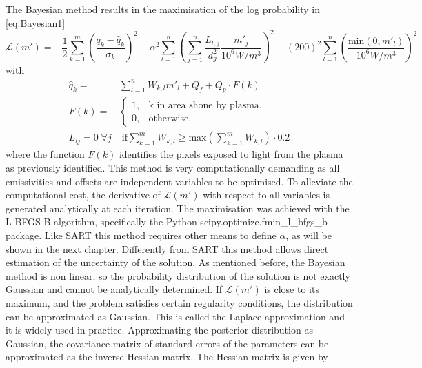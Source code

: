 The Bayesian  method results in the maximisation of the log probability in \autoref{eq:Bayesian1}
\begin{equation}
\mathcal{L}(m') = -\frac{1}{2} \sum_{k=1}^{m} \left(\frac{q_k - \hat{q}_k}{\sigma_k}\right)^2 - \alpha^2\sum_{l=1}^{n} \left(\sum_{j=1}^{n} \frac{L_{l,j}}{d_g^2} \frac{m'_{j}}{10^6W/m^3} \right)^2 - (200)^2\sum_{l=1}^{n} \left( \frac{\mathrm{min}(0,m'_l)}{10^6W/m^3} \right)^2
\label{eq:Bayesian1}
\end{equation}
with
\begin{equation}
\label{eq:Bayesian2}
\begin{aligned}
\hat{q}_k =& \sum_{l=1}^{n} W_{k,l} m'_{l} + Q_f + Q_p \cdot F(k) \\
F(k) =& \begin{cases}
    1, & \text{k in area shone by plasma}.\\
    0, & \text{otherwise}.
    \end{cases} \\
L_{lj} =0 \; \forall j & \; \mathrm{if} \sum_{k=1}^{m} W_{k,l} \geq \mathrm{max} \left( \sum_{k=1}^{m} W_{k,l} \right) \cdot 0.2
\end{aligned}
\end{equation}
where the function $F(k)$ identifies the pixels exposed to light from the plasma as previously identified.
This method is very computationally demanding as all emissivities and offsets are independent variables to be optimised. To alleviate the computational cost, the derivative of $\mathcal{L}(m')$ with respect to all variables is generated analytically at each iteration. The maximisation was achieved with the L-BFGS-B algorithm, specifically the Python scipy.optimize.fmin\_l\_bfgs\_b package. \cite{Morales2011} Like SART this method requires other means to define $\alpha$, as will be shown in the next chapter.
Differently from SART this method allows direct estimation of the uncertainty of the solution. As mentioned before, the Bayesian method is non linear, so the probability distribution of the solution is not exactly Gaussian and cannot be analytically determined. If $\mathcal{L}(m')$ is close to its maximum, and the problem satisfies certain regularity conditions, the distribution can be approximated as Gaussian. This is called the Laplace approximation and it is widely used in practice.\cite{KarlFriston2007,Mackay1998} Approximating the posterior distribution as Gaussian, the covariance matrix of standard errors of the parameters can be approximated as the inverse Hessian matrix.\cite{Thacker2013,Rhodri,Shir2020} The Hessian matrix is given by


